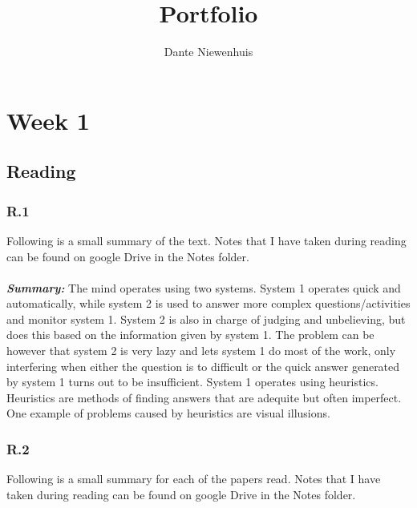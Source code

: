 \documentclass[]{article}
\title{Portfolio}
\author{Dante Niewenhuis}
\begin{document}
\maketitle
\tableofcontents

\section*{Week 1}

\subsection*{Reading} 

\subsubsection*{R.1} 
Following is a small summary of the text. Notes that I have taken during reading 
can be found on google Drive in the Notes folder.\\\\
\textbf{\textit{Summary:}} The mind operates using two systems. 
System 1 operates quick and automatically, while system 2 is used to answer 
more complex questions/activities and monitor system 1. System 2 is also in
charge of judging and unbelieving, but does this based on the information 
given by system 1. 
The problem can be however that system 2 is very lazy and lets system 1 do most of the work, only interfering 
when either the question is to difficult or the quick answer generated by 
system 1 turns out to be insufficient. System 1 operates using heuristics. 
Heuristics are methods of finding answers that are adequite but often imperfect.
One example of problems caused by heuristics are visual illusions.  

\subsubsection*{R.2}
Following is a small summary for each of the papers read. 
Notes that I have taken during reading can be found on google Drive in the Notes folder.
\end{document}
